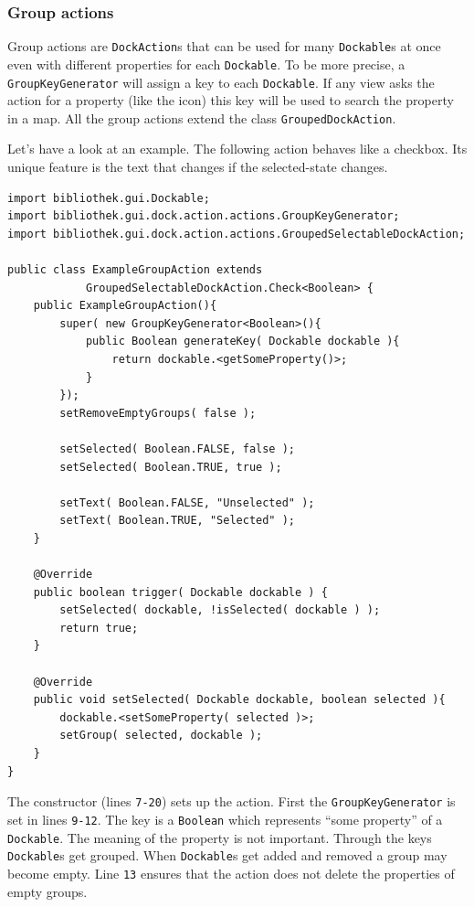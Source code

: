 \documentclass[a4paper,10pt]{article}
\newcommand{\src}[1]{\texttt{#1}}
\begin{document}
\subsubsection{Group actions}
Group actions are \src{DockAction}s that can be used for many \src{Dockable}s at once even with different properties for each \src{Dockable}. To be more precise, a \linebreak \src{GroupKeyGenerator} will assign a key to each \src{Dockable}. If any view asks the action for a property (like the icon) this key will be used to search the property in a map. All the group actions extend the class \src{GroupedDockAction}.

Let's have a look at an example. The following action behaves like a checkbox. Its unique feature is the text that changes if the selected-state changes.
\begin{lstlisting}
import bibliothek.gui.Dockable;
import bibliothek.gui.dock.action.actions.GroupKeyGenerator;
import bibliothek.gui.dock.action.actions.GroupedSelectableDockAction;

public class ExampleGroupAction extends 
			GroupedSelectableDockAction.Check<Boolean> {
    public ExampleGroupAction(){
        super( new GroupKeyGenerator<Boolean>(){
        	public Boolean generateKey( Dockable dockable ){
        		return dockable.<getSomeProperty()>;
        	}
        });
        setRemoveEmptyGroups( false );
                
        setSelected( Boolean.FALSE, false );
        setSelected( Boolean.TRUE, true );
        
        setText( Boolean.FALSE, "Unselected" );
        setText( Boolean.TRUE, "Selected" );
    }
    
    @Override
    public boolean trigger( Dockable dockable ) {
        setSelected( dockable, !isSelected( dockable ) );
        return true;
    }
    
    @Override
    public void setSelected( Dockable dockable, boolean selected ){
    	dockable.<setSomeProperty( selected )>;
    	setGroup( selected, dockable );
    }    
}
\end{lstlisting}
The constructor (lines \src{7-20}) sets up the action. First the \src{GroupKeyGenerator} is set in lines \src{9-12}. The key is a \src{Boolean} which represents ``some property'' of a \src{Dockable}. The meaning of the property is not important. Through the keys \src{Dockable}s get grouped. When \src{Dockable}s get added and removed a group may become empty. Line \src{13} ensures that the action does not delete the properties of empty groups.
\end{document}
